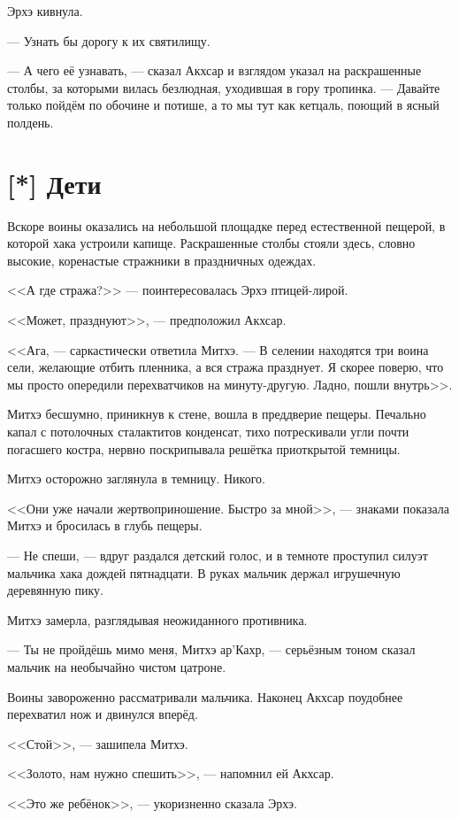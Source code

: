 Эрхэ кивнула.

--- Узнать бы дорогу к их святилищу.

--- А чего её узнавать, --- сказал Акхсар и взглядом указал на раскрашенные столбы, за которыми вилась безлюдная, уходившая в гору тропинка.
--- Давайте только пойдём по обочине и потише, а то мы тут как кетцаль, поющий в ясный полдень.

\section{[*] Дети}

Вскоре воины оказались на небольшой площадке перед естественной пещерой, в которой хака устроили капище.
Раскрашенные столбы стояли здесь, словно высокие, коренастые стражники в праздничных одеждах.

<<А где стража?>> --- поинтересовалась Эрхэ птицей-лирой.

<<Может, празднуют>>, --- предположил Акхсар.

<<Ага, --- саркастически ответила Митхэ.
--- В селении находятся три воина сели, желающие отбить пленника, а вся стража празднует.
Я скорее поверю, что мы просто опередили перехватчиков на минуту-другую.
Ладно, пошли внутрь>>.

Митхэ бесшумно, приникнув к стене, вошла в преддверие пещеры.
Печально капал с потолочных сталактитов конденсат, тихо потрескивали угли почти погасшего костра, нервно поскрипывала решётка приоткрытой темницы.

Митхэ осторожно заглянула в темницу.
Никого.

<<Они уже начали жертвоприношение. Быстро за мной>>, --- знаками показала Митхэ и бросилась в глубь пещеры.

--- Не спеши, --- вдруг раздался детский голос, и в темноте проступил силуэт мальчика хака дождей пятнадцати.
В руках мальчик держал игрушечную деревянную пику.

Митхэ замерла, разглядывая неожиданного противника.

--- Ты не пройдёшь мимо меня, Митхэ ар’Кахр, --- серьёзным тоном сказал мальчик на необычайно чистом цатроне.

Воины завороженно рассматривали мальчика.
Наконец Акхсар поудобнее перехватил нож и двинулся вперёд.

<<Стой>>, --- зашипела Митхэ.

<<Золото, нам нужно спешить>>, --- напомнил ей Акхсар.

<<Это же ребёнок>>, --- укоризненно сказала Эрхэ.

